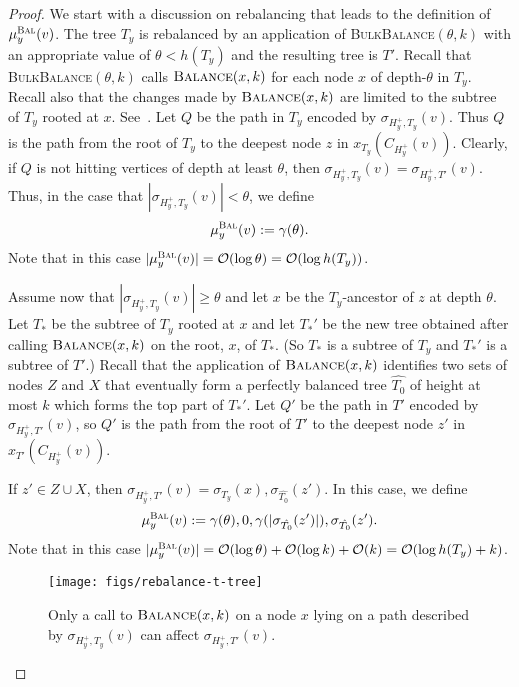 \documentclass[kpfonts]{patmorin}
\newcommand{\Oh}{\mathcal{O}}
\let\geq\geqslant
\begin{document}
\begin{proof}
  We start with a discussion on rebalancing that leads to the definition of $\mu_y^{\textsc{Bal}}(v)$. 
  The tree $T_y$ is rebalanced by an application of \textsc{BulkBalance}$(\theta,k)$ with an appropriate value of $\theta < h(T_y)$ and the resulting tree is $T'$.
  Recall that \textsc{BulkBalance}$(\theta,k)$ calls $\textsc{Balance}(x,k)$ for each node $x$ of depth-$\theta$ in $T_y$.
  Recall also that the changes made by $\textsc{Balance}(x,k)$ are limited to the subtree of $T_y$ rooted at $x$.
  See~. 
  Let $Q$ be the path in $T_y$ encoded by $\sigma_{H^+_{y},T_{y}}(v)$. 
  Thus $Q$ is the path from the root of $T_y$ to the deepest node $z$ in $x_{T_y}(C_{H^+_{y}}(v))$.
  Clearly, if $Q$ is not hitting vertices of depth at least $\theta$, then $\sigma_{H^+_{y},T_{y}}(v)=\sigma_{H^+_{y},T'}(v)$.
  Thus, in the case that $|\sigma_{H^+_{y},T_{y}}(v)| < \theta$, we define
  \[
  \mu_y^{\textsc{Bal}}(v) := \gamma(\theta).
  \]
  Note that in this case $|\mu_y^{\textsc{Bal}}(v)| = \Oh(\log \theta) = \Oh(\log h(T_y))$.

  Assume now that $|\sigma_{H^+_{y},T_{y}}(v)| \geq \theta$ and let $x$ be the $T_y$-ancestor of $z$ at depth $\theta$. 
  Let $T_*$ be the subtree of $T_y$ rooted at $x$ and let $T_*'$ be the new tree obtained after calling $\textsc{Balance}(x,k)$ on the root, $x$, of $T_*$. (So $T_*$ is a subtree of $T_y$ and $T_*'$ is a subtree of $T'$.)
  Recall that the application of $\textsc{Balance}(x,k)$ identifies two sets of nodes $Z$ and $X$ that eventually form a perfectly balanced tree $\hat{T_0}$ of height at most $k$ which forms the top part of $T_*'$.
  Let $Q'$ be the path in $T'$ encoded by $\sigma_{H^+_y,T'}(v)$, so $Q'$ is the path from the root of $T'$ to the deepest node $z'$ in $x_{T'}(C_{H^+_y}(v))$.
  
  If $z' \in Z\cup X$, then $\sigma_{H^+_y,T'}(v) = \sigma_{T_y}(x),\sigma_{\hat{T_0}}(z')$.
  In this case, we define
  \[
  \mu_y^{\textsc{Bal}}(v) := \gamma(\theta),0,\gamma(|\sigma_{\hat{T_0}}(z')|),\sigma_{\hat{T_0}}(z').
  \]
  Note that in this case $|\mu_y^{\textsc{Bal}}(v)|=\Oh(\log\theta)+\Oh(\log k) + \Oh(k) = \Oh(\log h(T_y)+k)$.

  \begin{figure}
    \begin{center}
      \texttt{[image: figs/rebalance-t-tree]}
    \end{center}
    \caption{Only a call to $\textsc{Balance}(x,k)$ on a node $x$ lying on a path described by $\sigma_{H^+_y,T_y}(v)$ can affect $\sigma_{H^+_y,T'}(v)$.}
  \end{figure}


\end{proof}
\end{document}
